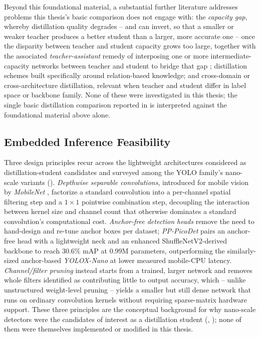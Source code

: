 Beyond this foundational material, a substantial further literature addresses problems this thesis's basic comparison does not engage with: the \emph{capacity gap}, whereby distillation quality degrades -- and can invert, so that a smaller or weaker teacher produces a better student than a larger, more accurate one -- once the disparity between teacher and student capacity grows too large, together with the associated \emph{teacher-assistant} remedy of interposing one or more intermediate-capacity networks between teacher and student to bridge that gap \cite{mirzadehImprovedKnowledgeDistillation2020}; distillation schemes built specifically around relation-based knowledge; and cross-domain or cross-architecture distillation, relevant when teacher and student differ in label space or backbone family. None of these were investigated in this thesis; the single basic distillation comparison reported in  is interpreted against the foundational material above alone.

\subsection{Embedded Inference Feasibility}\label{sec:lit_embedded_inference}

Three design principles recur across the lightweight architectures considered as distillation-student candidates and surveyed among the YOLO family's nano-scale variants (). \emph{Depthwise separable convolutions}, introduced for mobile vision by \textit{MobileNet} \cite{howardMobileNetsEfficientConvolutional2017}, factorize a standard convolution into a per-channel spatial filtering step and a $1\times1$ pointwise combination step, decoupling the interaction between kernel size and channel count that otherwise dominates a standard convolution's computational cost. \emph{Anchor-free detection heads} remove the need to hand-design and re-tune anchor boxes per dataset; \textit{PP-PicoDet} \cite{yuPPPicoDetBetterRealTime2021} pairs an anchor-free head with a lightweight neck and an enhanced ShuffleNetV2-derived backbone to reach $30.6\%$ mAP at $0.99$M parameters, outperforming the similarly-sized anchor-based \textit{YOLOX-Nano} at lower measured mobile-CPU latency. \emph{Channel/filter pruning} \cite{liPruningFiltersEfficient2017} instead starts from a trained, larger network and removes whole filters identified as contributing little to output accuracy, which -- unlike unstructured weight-level pruning -- yields a smaller but still dense network that runs on ordinary convolution kernels without requiring sparse-matrix hardware support. These three principles are the conceptual background for why nano-scale detectors were the candidates of interest as a distillation student (, ); none of them were themselves implemented or modified in this thesis.

